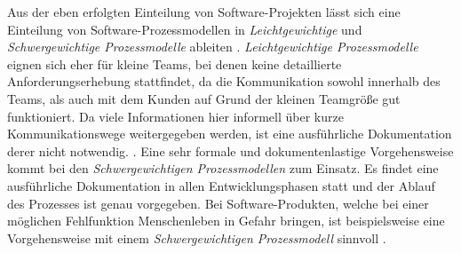Aus der eben erfolgten Einteilung von Software-Projekten lässt sich eine Einteilung von Software-Prozessmodellen in \textit{Leichtgewichtige} und \textit{Schwergewichtige Prozessmodelle} ableiten \cite{Hanser2010}. \newline
\textit{Leichtgewichtige Prozessmodelle} eignen sich eher für kleine Teams, bei denen keine detaillierte Anforderungserhebung stattfindet, da die Kommunikation sowohl innerhalb des Teams, als auch mit dem Kunden auf Grund der kleinen Teamgröße gut funktioniert. Da viele Informationen hier informell über kurze Kommunikationswege weitergegeben werden, ist eine ausführliche Dokumentation derer nicht notwendig. \cite{Hanser2010}. \newline
Eine sehr formale und dokumentenlastige Vorgehensweise kommt bei den \textit{Schwergewichtigen Prozessmodellen} zum Einsatz. Es findet eine ausführliche Dokumentation in allen Entwicklungsphasen statt und der Ablauf des Prozesses ist genau vorgegeben. Bei Software-Produkten, welche bei einer möglichen Fehlfunktion Menschenleben in Gefahr bringen, ist beispielsweise eine Vorgehensweise mit einem \textit{Schwergewichtigen Prozessmodell} sinnvoll \cite{Hanser2010}. \newline













